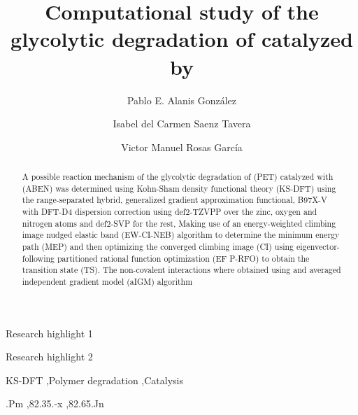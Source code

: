 \begin{frontmatter}

    \title{Computational study of the glycolytic degradation of  catalyzed by }

    \author[1]{Pablo E. Alanis González}

    \author[1]{Isabel del Carmen Saenz Tavera}

    \author[1]{Victor Manuel Rosas García}


    \begin{abstract}
        A possible reaction mechanism of the glycolytic degradation of  (PET) catalyzed with  (ABEN) was determined using Kohn-Sham density functional theory (KS-DFT) using the range-separated hybrid, generalized gradient approximation functional, \chemomega B97X-V with DFT-D4 dispersion correction \cite{Mardirossian2014} using def2-TZVPP over the zinc, oxygen and nitrogen atoms and def2-SVP for the rest, Making use of an energy-weighted climbing image nudged elastic band (EW-CI-NEB) algorithm \cite{Asgeirsson2021} to determine the minimum energy path (MEP) and then optimizing the converged climbing image (CI) using eigenvector-following partitioned rational function optimization (EF P-RFO) to obtain the transition state (TS). The non-covalent interactions where obtained using and averaged independent gradient model (aIGM) algorithm \cite{Lefebvre2018}
    \end{abstract}

    \begin{graphicalabstract}
    \end{graphicalabstract}

    \begin{highlights}
        \item Research highlight 1
        \item Research highlight 2
    \end{highlights}

    \begin{keyword}

        KS-DFT \sep Polymer degradation \sep Catalysis

        .Pm \sep 82.35.-x \sep 82.65.Jn
    \end{keyword}

\end{frontmatter}